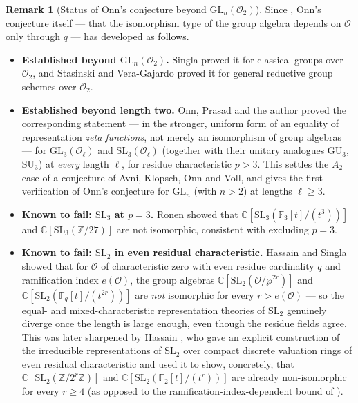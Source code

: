 \documentclass[11pt]{amsart}
\theoremstyle{definition}
\newtheorem{remark}[theorem]{Remark}
\newcommand{\GL}{\mathrm{GL}}
\begin{document}
	\begin{remark}[Status of Onn's conjecture beyond $\GL_n(\mathcal O_2)$]
		Since \cite{Thesis}, Onn's conjecture itself — that the isomorphism type
		of the group algebra depends on $\mathcal O$ only through $q$ — has
		developed as follows.
		
		\begin{itemize}
			\item[(a)] \textbf{Established beyond $\GL_n(\mathcal O_2)$.} Singla
			\cite{SinglaClassical2012} proved it for classical groups over
			$\mathcal O_2$, and Stasinski and Vera-Gajardo \cite{SVG2019} proved it
			for general reductive group schemes over $\mathcal O_2$.
			
			\item[(b)] \textbf{Established beyond length two.} Onn, Prasad and the
			author \cite{OPS2025} proved the corresponding statement — in the
			stronger, uniform form of an equality of representation \emph{zeta
				functions}, not merely an isomorphism of group algebras — for
			$\GL_3(\mathcal O_\ell)$ and $\mathrm{SL}_3(\mathcal O_\ell)$ (together
			with their unitary analogues $\mathrm{GU}_3$, $\mathrm{SU}_3$) at
			\emph{every} length $\ell$, for residue characteristic $p>3$. This
			settles the $A_2$ case of a conjecture of Avni, Klopsch, Onn and Voll,
			and gives the first verification of Onn's conjecture for $\GL_n$ (with
			$n>2$) at lengths $\ell\ge 3$.
			
			\item[(c)] \textbf{Known to fail: $\mathrm{SL}_3$ at $p=3$.} Ronen
			\cite{Ronen2023} showed that $\mathbb C[\mathrm{SL}_3(\mathbb
			F_3[t]/(t^3))]$ and $\mathbb C[\mathrm{SL}_3(\mathbb Z/27)]$ are not
			isomorphic, consistent with \cite{OPS2025} excluding $p=3$.
			
			\item[(d)] \textbf{Known to fail: $\mathrm{SL}_2$ in even residual
				characteristic.} Hassain and Singla \cite{HS2022} showed that for
			$\mathcal O$ of characteristic zero with even residue cardinality $q$ and
			ramification index $e(\mathcal O)$, the group algebras $\mathbb
			C[\mathrm{SL}_2(\mathcal O/\wp^{2r})]$ and $\mathbb C[\mathrm{SL}_2(\mathbb
			F_q[t]/(t^{2r}))]$ are \emph{not} isomorphic for every $r>e(\mathcal O)$
			— so the equal- and mixed-characteristic representation theories of
			$\mathrm{SL}_2$ genuinely diverge once the length is large enough, even
			though the residue fields agree. This was later sharpened by Hassain
			\cite{Hassain2023}, who gave an explicit construction of the irreducible
			representations of $\mathrm{SL}_2$ over compact discrete valuation rings
			of even residual characteristic and used it to show, concretely, that
			$\mathbb C[\mathrm{SL}_2(\mathbb Z/2^r\mathbb Z)]$ and $\mathbb
			C[\mathrm{SL}_2(\mathbb F_2[t]/(t^r))]$ are already non-isomorphic for
			every $r\ge 4$ (as opposed to the ramification-index-dependent bound of
			\cite{HS2022}).
		\end{itemize}
		

\end{remark}
\end{document}
